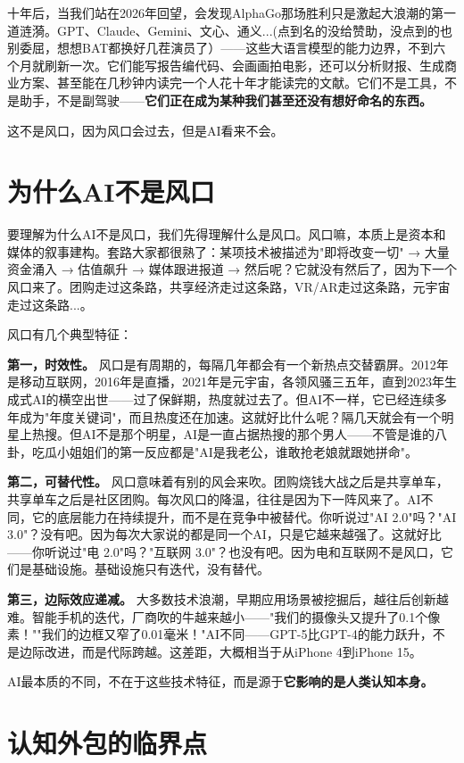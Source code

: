 十年后，当我们站在2026年回望，会发现AlphaGo那场胜利只是激起大浪潮的第一道涟漪。GPT、Claude、Gemini、文心、通义...(点到名的没给赞助，没点到的也别委屈，想想BAT都换好几茬演员了）——这些大语言模型的能力边界，不到六个月就刷新一次。它们能写报告编代码、会画画拍电影，还可以分析财报、生成商业方案、甚至能在几秒钟内读完一个人花十年才能读完的文献。它们不是工具，不是助手，不是副驾驶——\textbf{它们正在成为某种我们甚至还没有想好命名的东西。}

这不是风口，因为风口会过去，但是AI看来不会。


\section{为什么AI不是风口}


要理解为什么AI不是风口，我们先得理解什么是风口。风口嘛，本质上是资本和媒体的叙事建构。套路大家都很熟了：某项技术被描述为"即将改变一切" → 大量资金涌入 → 估值飙升 → 媒体跟进报道 → 然后呢？它就没有然后了，因为下一个风口来了。团购走过这条路，共享经济走过这条路，VR/AR走过这条路，元宇宙走过这条路...。

风口有几个典型特征：

\textbf{第一，时效性。} 风口是有周期的，每隔几年都会有一个新热点交替霸屏。2012年是移动互联网，2016年是直播，2021年是元宇宙，各领风骚三五年，直到2023年生成式AI的横空出世——过了保鲜期，热度就过去了。但AI不一样，它已经连续多年成为"年度关键词"，而且热度还在加速。这就好比什么呢？隔几天就会有一个明星上热搜。但AI不是那个明星，AI是一直占据热搜的那个男人——不管是谁的八卦，吃瓜小姐姐们的第一反应都是"AI是我老公，谁敢抢老娘就跟她拼命"。

\textbf{第二，可替代性。} 风口意味着有别的风会来吹。团购烧钱大战之后是共享单车，共享单车之后是社区团购。每次风口的降温，往往是因为下一阵风来了。AI不同，它的底层能力在持续提升，而不是在竞争中被替代。你听说过"AI 2.0"吗？"AI 3.0"？没有吧。因为每次大家说的都是同一个AI，只是它越来越强了。这就好比——你听说过"电 2.0"吗？"互联网 3.0"？也没有吧。因为电和互联网不是风口，它们是基础设施。基础设施只有迭代，没有替代。

\textbf{第三，边际效应递减。} 大多数技术浪潮，早期应用场景被挖掘后，越往后创新越难。智能手机的迭代，厂商吹的牛越来越小——"我们的摄像头又提升了0.1个像素！""我们的边框又窄了0.01毫米！"AI不同——GPT-5比GPT-4的能力跃升，不是边际改进，而是代际跨越。这差距，大概相当于从iPhone 4到iPhone 15。

AI最本质的不同，不在于这些技术特征，而是源于\textbf{它影响的是人类认知本身。}


\section{认知外包的临界点}


